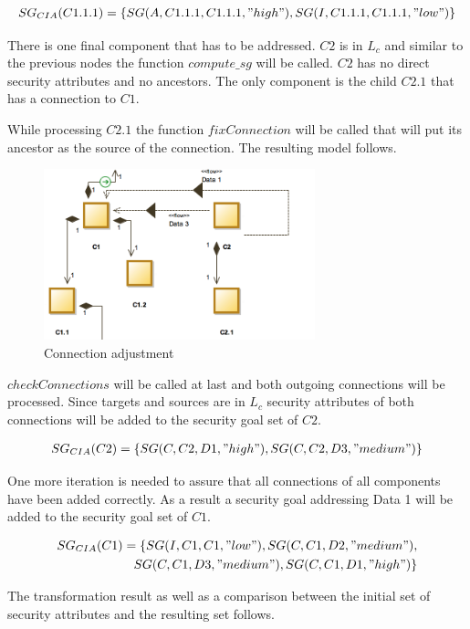 \begin{align*}
SG_{CIA}(C1.1.1) = \{SG(A,C1.1.1,C1.1.1,"high"), SG(I,C1.1.1,C1.1.1,"low")\}
\end{align*}

There is one final component that has to be addressed. $C2$ is in $L_c$ and similar to the previous nodes the function $compute\_sg$ will be called. $C2$ has no direct security attributes and no ancestors. The only component is the child $C2.1$ that has a connection to $C1$. 

While processing $C2.1$ the function $fixConnection$ will be called that will  put its ancestor as the source of the connection. The resulting model follows.

\begin{figure}[H]
\centering
\includegraphics[width=0.7\textwidth]{pictures/con_c2}
\caption{Connection adjustment}
\label{fig:con_c2}
\end{figure}

$checkConnections$ will be called at last and both outgoing connections will be processed. Since targets and sources are in $L_c$ security attributes of both connections will be added to the security goal set of $C2$. 

\begin{align*}
SG_{CIA}(C2) = \{SG(C,C2,D1,"high"), SG(C,C2,D3,"medium")\}
\end{align*}

One more iteration is needed to assure that all connections of all components have been added correctly. As a result a security goal addressing Data 1 will be added to the security goal set of $C1$.

\begin{align*}
SG_{CIA}(C1) = \{SG(I,C1,C1,"low"), SG(C,C1,D2, "medium"), \\ SG(C,C1,D3,"medium"), SG(C,C1,D1,"high")\}
\end{align*} 

The transformation result as well as a comparison between the initial set of security attributes and the resulting set follows.

